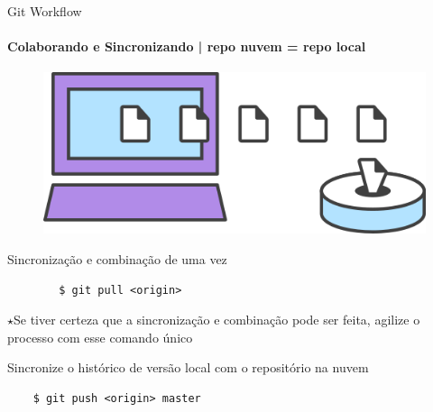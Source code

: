 \documentclass[xcolor=dvipsnames,t]{beamer}
\begin{document}
\begin{frame}[fragile]{Git Workflow}
\framesubtitle{Colaborando e Sincronizando  | repo nuvem = repo local }
\begin{figure}
	\centering			
	\includegraphics[width=0.2\linewidth]{figures/gitclone}
\end{figure}

\begin{exampleblock}{Sincronização e combinação de uma vez}
	\begin{verbatim}
		$ git pull <origin>
	\end{verbatim}
\end{exampleblock}
{\tiny$ \star $Se tiver certeza que a sincronização e combinação pode ser feita, agilize o processo com esse comando único}

\begin{block}{Sincronize o histórico de versão local com o repositório na nuvem}		
	\begin{verbatim}
	$ git push <origin> master
	\end{verbatim}
\end{block}			


\end{frame}
\end{document}
